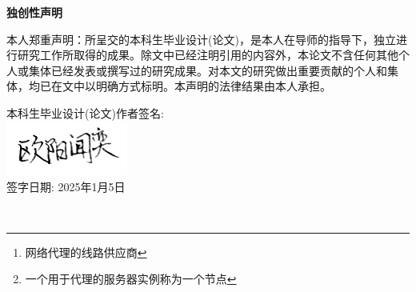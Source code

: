 \documentclass[12pt,a4paper]{article}%
\begin{document}
\newpage

\thispagestyle{empty}%
\begin{center}
    \large \textbf{独创性声明}
\end{center}

\setlength{\parindent}{2em} %
\setlength{\parskip}{2em}  %
{\fangsong %
本人郑重声明：所呈交的本科生毕业设计(论文)，是本人在导师的指导下，独立进行研究工作所取得的成果。除文中已经注明引用的内容外，本论文不含任何其他个人或集体已经发表或撰写过的研究成果。对本文的研究做出重要贡献的个人和集体，均已在文中以明确方式标明。本声明的法律结果由本人承担。

\begin{flushright} %
本科生毕业设计(论文)作者签名:\\
\vspace{1em} %
\includegraphics[width=4cm]{img/owalabuy_sign.png} \\ %
签字日期: 2025年1月5日
\end{flushright}}

\newpage

\fancyhf{} %

\begin{abstract}
	\fangsong
    网络代理是我们常用的反审查手段 目前主流的内核有xray-core v2ray-core sing-box hysteria2 clash等等 它们需要用户手动编写配置文件 较为麻烦且对用户的技术水平要求较高 所以代理线路管理软件出现了 在Windows平台和Android平台上有一些GUI客户端 如V2RayN/G Clash系 Surfboard 它们都是基于图形界面的 支持对机场\footnote{网络代理的线路供应商}的订阅链接进行解析 获取到链接中的节点\footnote{一个用于代理的服务器实例称为一个节点}信息 用户还可以手动添加节点 用户直接在GUI客户端中选择节点 进行连接
\end{abstract}

\begin{adjustwidth}{1.06cm}{1.06cm}
    \fontsize{10.5pt}{15.75pt}\\
\end{adjustwidth}
\end{document}
